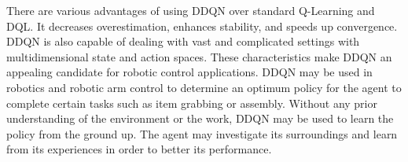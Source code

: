 \documentclass[12pt,oneside]{article}
\begin{document}

There are various advantages of using DDQN over standard Q-Learning and DQL. It decreases overestimation, enhances stability, and speeds up convergence. DDQN is also capable of dealing with vast and complicated settings with multidimensional state and action spaces. These characteristics make DDQN an appealing candidate for robotic control applications.
DDQN may be used in robotics and robotic arm control to determine an optimum policy for the agent to complete certain tasks such as item grabbing or assembly. Without any prior understanding of the environment or the work, DDQN may be used to learn the policy from the ground up. The agent may investigate its surroundings and learn from its experiences in order to better its performance.
\end{document}
